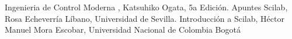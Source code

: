 \documentclass[12pt,a4paper]{IEEEtran}
\begin{document}
 
 




 










\begin{thebibliography}{99}
	 Ingenieria de Control Moderna , Katsuhiko Ogata, 5a Edición.
	 Apuntes Scilab, Rosa Echeverría Líbano, Universidad de Sevilla.
	 Introducción a Scilab, Héctor Manuel Mora Escobar, Universidad Nacional de Colombia Bogotá
\end{thebibliography}
\end{document}

